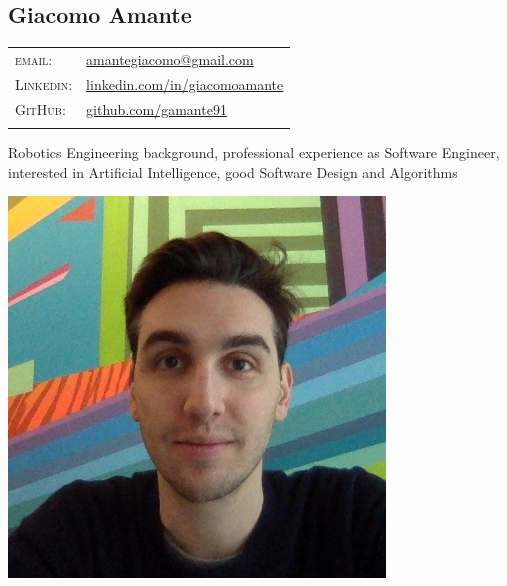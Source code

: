 \documentclass[a4paper,10pt]{article}
\begin{document}
	
	\pagestyle{empty}

	\begin{minipage}{0.75\textwidth}
		\vspace{-10mm}
		\begin{flushleft}
			\section{\Huge Giacomo Amante}
			\vspace{2mm}
			\begin{tabular}{ll}
				\textsc{email:} & \href{mailto:amantegiacomo@gmail.com}{amantegiacomo@gmail.com} \\
				\textsc{Linkedin:} & 
				\href{http://www.linkedin.com/in/giacomoamante}{\color{black}linkedin.com/in/giacomoamante}\\
				\textsc{GitHub:} & \href{https://github.com/gamante91}{github.com/gamante91}\\
				\multicolumn{2}{c}{} \\
			\end{tabular}
		\end{flushleft}
	Robotics Engineering background, professional experience as Software Engineer,\\
	interested in Artificial Intelligence, good Software Design and Algorithms\\
	\end{minipage}
	\begin{minipage}[c]{0.25\textwidth}
		\begin{center}
			\includegraphics[width=0.75\textwidth]{GiacomoAmante_lowres}
		\end{center}
	\end{minipage}
\end{document}
